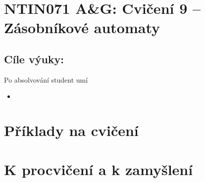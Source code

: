 \documentclass[a4paper,12pt]{amsart}
\begin{document}
\thispagestyle{empty}

\section*{NTIN071 A\&G: Cvičení 9 -- Zásobníkové automaty}

\medskip

\subsection*{Cíle výuky:} Po absolvování student umí

\begin{itemize}\setlength{\itemsep}{0pt}
    \item 
\end{itemize}

\section*{Příklady na cvičení}

\medskip\begin{problem} 

\end{problem}


\section*{K procvičení a k zamyšlení}


\medskip\begin{problem}

\end{problem}
\end{document}
